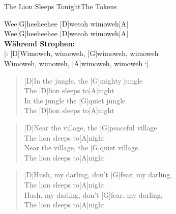 \begin{song}{The Lion Sleeps Tonight}{The Tokens}

    \begin{chorus}
        [D]Wee[G]heeheehee [D]weeoh wimoweh[A]  \\
        [D]Wee[G]heeheehee [D]weeoh wimoweh[A] \\
        \textbf{Während Strophen:} \\
        |: [D]Wimoweh, wimoweh, [G]wimoweh, wimoweh \\
        [D]Wimoweh, wimoweh, [A]wimoweh, wimoweh :|
    \end{chorus}

    \begin{verse}  
        [D]In the jungle, the [G]mighty jungle \\
        The [D]lion sleeps to[A]night \\
        [D]In the jungle the [G]quiet jungle \\
        The [D]lion sleeps to[A]night
    \end{verse}  


    \begin{verse}  
        [D]Near the village, the [G]peaceful village \\
        [D]The lion sleeps to[A]night \\
        [D]Near the village, the [G]quiet village \\
        [D]The lion sleeps to[A]night
    \end{verse}  


    \begin{verse}  
        [D]Hush, my darling, don't [G]fear, my darling, \\
        [D]The lion sleeps to[A]night \\
        [D]Hush, my darling, don't [G]fear, my darling, \\
        [D]The lion sleeps to[A]night
    \end{verse}  


\end{song}
